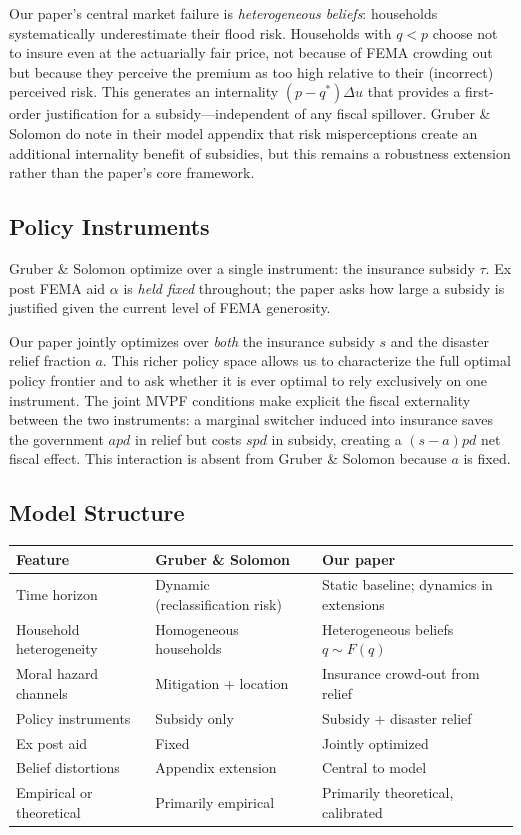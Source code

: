 \documentclass[12pt]{article}
\begin{document}
Our paper's central market failure is \emph{heterogeneous beliefs}: households systematically underestimate their flood risk. Households with $q < p$ choose not to insure even at the actuarially fair price, not because of FEMA crowding out but because they perceive the premium as too high relative to their (incorrect) perceived risk. This generates an internality $(p - q^*)\Delta u$ that provides a first-order justification for a subsidy---independent of any fiscal spillover. Gruber \& Solomon do note in their model appendix that risk misperceptions create an additional internality benefit of subsidies, but this remains a robustness extension rather than the paper's core framework.

\subsection{Policy Instruments}

Gruber \& Solomon optimize over a single instrument: the insurance subsidy $\tau$. Ex post FEMA aid $\alpha$ is \emph{held fixed} throughout; the paper asks how large a subsidy is justified given the current level of FEMA generosity.

Our paper jointly optimizes over \emph{both} the insurance subsidy $s$ and the disaster relief fraction $a$. This richer policy space allows us to characterize the full optimal policy frontier and to ask whether it is ever optimal to rely exclusively on one instrument. The joint MVPF conditions make explicit the fiscal externality between the two instruments: a marginal switcher induced into insurance saves the government $apd$ in relief but costs $spd$ in subsidy, creating a $(s - a)pd$ net fiscal effect. This interaction is absent from Gruber \& Solomon because $a$ is fixed.

\subsection{Model Structure}

\begin{center}
\small
\begin{tabular}{p{4cm}p{5cm}p{5cm}}
\toprule
Feature & Gruber \& Solomon & Our paper \\
\midrule
Time horizon & Dynamic (reclassification risk) & Static baseline; dynamics in extensions \\
Household heterogeneity & Homogeneous households & Heterogeneous beliefs $q \sim F(q)$ \\
Moral hazard channels & Mitigation + location & Insurance crowd-out from relief \\
Policy instruments & Subsidy only & Subsidy + disaster relief \\
Ex post aid & Fixed & Jointly optimized \\
Belief distortions & Appendix extension & Central to model \\
Empirical or theoretical & Primarily empirical & Primarily theoretical, calibrated \\
\bottomrule
\end{tabular}
\end{center}
\end{document}
